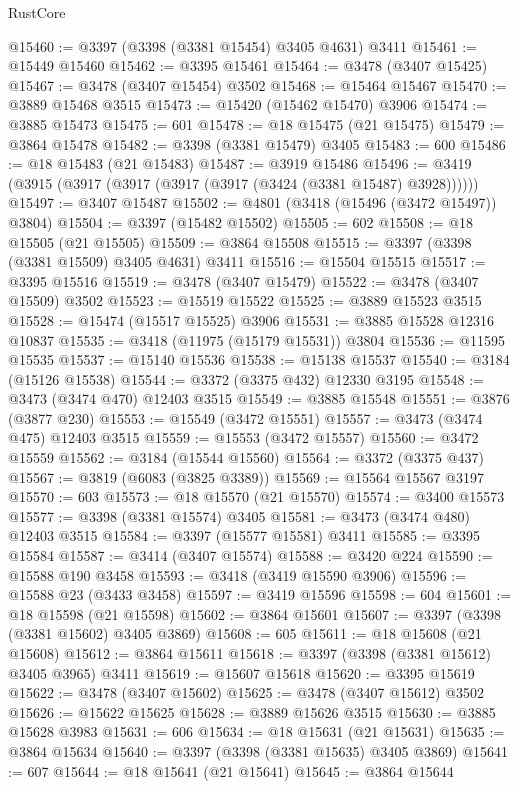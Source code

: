 \begin{lexlean}{RustCore}
\begin{coremodule}
@15460 := @3397 (@3398 (@3381 @15454) @3405 @4631) @3411
@15461 := @15449 @15460
@15462 := @3395 @15461
@15464 := @3478 (@3407 @15425)
@15467 := @3478 (@3407 @15454) @3502
@15468 := @15464 @15467
@15470 := @3889 @15468 @3515
@15473 := @15420 (@15462 @15470) @3906
@15474 := @3885 @15473
@15475 := 601
@15478 := @18 @15475 (@21 @15475)
@15479 := @3864 @15478
@15482 := @3398 (@3381 @15479) @3405
@15483 := 600
@15486 := @18 @15483 (@21 @15483)
@15487 := @3919 @15486
@15496 := @3419 (@3915 (@3917 (@3917 (@3917 (@3917 (@3424 (@3381 @15487) @3928))))))
@15497 := @3407 @15487
@15502 := @4801 (@3418 (@15496 (@3472 @15497)) @3804)
@15504 := @3397 (@15482 @15502)
@15505 := 602
@15508 := @18 @15505 (@21 @15505)
@15509 := @3864 @15508
@15515 := @3397 (@3398 (@3381 @15509) @3405 @4631) @3411
@15516 := @15504 @15515
@15517 := @3395 @15516
@15519 := @3478 (@3407 @15479)
@15522 := @3478 (@3407 @15509) @3502
@15523 := @15519 @15522
@15525 := @3889 @15523 @3515
@15528 := @15474 (@15517 @15525) @3906
@15531 := @3885 @15528 @12316 @10837
@15535 := @3418 (@11975 (@15179 @15531)) @3804
@15536 := @11595 @15535
@15537 := @15140 @15536
@15538 := @15138 @15537
@15540 := @3184 (@15126 @15538)
@15544 := @3372 (@3375 @432) @12330 @3195
@15548 := @3473 (@3474 @470) @12403 @3515
@15549 := @3885 @15548
@15551 := @3876 (@3877 @230)
@15553 := @15549 (@3472 @15551)
@15557 := @3473 (@3474 @475) @12403 @3515
@15559 := @15553 (@3472 @15557)
@15560 := @3472 @15559
@15562 := @3184 (@15544 @15560)
@15564 := @3372 (@3375 @437)
@15567 := @3819 (@6083 (@3825 @3389))
@15569 := @15564 @15567 @3197
@15570 := 603
@15573 := @18 @15570 (@21 @15570)
@15574 := @3400 @15573
@15577 := @3398 (@3381 @15574) @3405
@15581 := @3473 (@3474 @480) @12403 @3515
@15584 := @3397 (@15577 @15581) @3411
@15585 := @3395 @15584
@15587 := @3414 (@3407 @15574)
@15588 := @3420 @224
@15590 := @15588 @190 @3458
@15593 := @3418 (@3419 @15590 @3906)
@15596 := @15588 @23 (@3433 @3458)
@15597 := @3419 @15596
@15598 := 604
@15601 := @18 @15598 (@21 @15598)
@15602 := @3864 @15601
@15607 := @3397 (@3398 (@3381 @15602) @3405 @3869)
@15608 := 605
@15611 := @18 @15608 (@21 @15608)
@15612 := @3864 @15611
@15618 := @3397 (@3398 (@3381 @15612) @3405 @3965) @3411
@15619 := @15607 @15618
@15620 := @3395 @15619
@15622 := @3478 (@3407 @15602)
@15625 := @3478 (@3407 @15612) @3502
@15626 := @15622 @15625
@15628 := @3889 @15626 @3515
@15630 := @3885 @15628 @3983
@15631 := 606
@15634 := @18 @15631 (@21 @15631)
@15635 := @3864 @15634
@15640 := @3397 (@3398 (@3381 @15635) @3405 @3869)
@15641 := 607
@15644 := @18 @15641 (@21 @15641)
@15645 := @3864 @15644

\end{coremodule}
\end{lexlean}
